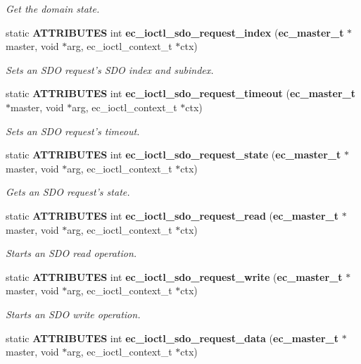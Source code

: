 \begin{DoxyCompactItemize}
\begin{DoxyCompactList}\small\item\em Get the domain state. \end{DoxyCompactList}\item 
static {\bf A\-T\-T\-R\-I\-B\-U\-T\-E\-S} int {\bf ec\-\_\-ioctl\-\_\-sdo\-\_\-request\-\_\-index} ({\bf ec\-\_\-master\-\_\-t} $\ast$master, void $\ast$arg, ec\-\_\-ioctl\-\_\-context\-\_\-t $\ast$ctx)
\begin{DoxyCompactList}\small\item\em Sets an S\-D\-O request's S\-D\-O index and subindex. \end{DoxyCompactList}\item 
static {\bf A\-T\-T\-R\-I\-B\-U\-T\-E\-S} int {\bf ec\-\_\-ioctl\-\_\-sdo\-\_\-request\-\_\-timeout} ({\bf ec\-\_\-master\-\_\-t} $\ast$master, void $\ast$arg, ec\-\_\-ioctl\-\_\-context\-\_\-t $\ast$ctx)
\begin{DoxyCompactList}\small\item\em Sets an S\-D\-O request's timeout. \end{DoxyCompactList}\item 
static {\bf A\-T\-T\-R\-I\-B\-U\-T\-E\-S} int {\bf ec\-\_\-ioctl\-\_\-sdo\-\_\-request\-\_\-state} ({\bf ec\-\_\-master\-\_\-t} $\ast$master, void $\ast$arg, ec\-\_\-ioctl\-\_\-context\-\_\-t $\ast$ctx)
\begin{DoxyCompactList}\small\item\em Gets an S\-D\-O request's state. \end{DoxyCompactList}\item 
static {\bf A\-T\-T\-R\-I\-B\-U\-T\-E\-S} int {\bf ec\-\_\-ioctl\-\_\-sdo\-\_\-request\-\_\-read} ({\bf ec\-\_\-master\-\_\-t} $\ast$master, void $\ast$arg, ec\-\_\-ioctl\-\_\-context\-\_\-t $\ast$ctx)
\begin{DoxyCompactList}\small\item\em Starts an S\-D\-O read operation. \end{DoxyCompactList}\item 
static {\bf A\-T\-T\-R\-I\-B\-U\-T\-E\-S} int {\bf ec\-\_\-ioctl\-\_\-sdo\-\_\-request\-\_\-write} ({\bf ec\-\_\-master\-\_\-t} $\ast$master, void $\ast$arg, ec\-\_\-ioctl\-\_\-context\-\_\-t $\ast$ctx)
\begin{DoxyCompactList}\small\item\em Starts an S\-D\-O write operation. \end{DoxyCompactList}\item 
static {\bf A\-T\-T\-R\-I\-B\-U\-T\-E\-S} int {\bf ec\-\_\-ioctl\-\_\-sdo\-\_\-request\-\_\-data} ({\bf ec\-\_\-master\-\_\-t} $\ast$master, void $\ast$arg, ec\-\_\-ioctl\-\_\-context\-\_\-t $\ast$ctx)

\end{DoxyCompactItemize}
